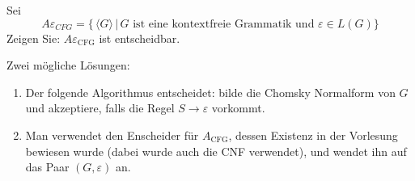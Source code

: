 Sei
\[
A\varepsilon_{CFG}=\{
\,\langle G\rangle\,|\,\text{$G$ ist eine kontextfreie Grammatik und $\varepsilon\in L(G)$}
\}
\]
Zeigen Sie: $A\varepsilon_{\text{CFG}}$ ist entscheidbar.


\begin{loesung}
Zwei mögliche Lösungen:
\begin{enumerate}
\item
Der folgende Algorithmus entscheidet: bilde die Chomsky Normalform von $G$
und akzeptiere, falls die Regel $S\to\varepsilon$ vorkommt.
\item
Man verwendet den Enscheider für $A_{\text{CFG}}$, dessen
Existenz in der Vorlesung bewiesen wurde (dabei wurde auch die CNF
verwendet), und wendet ihn auf das Paar $(G,\varepsilon)$ an.
\qedhere
\end{enumerate}
\end{loesung}
